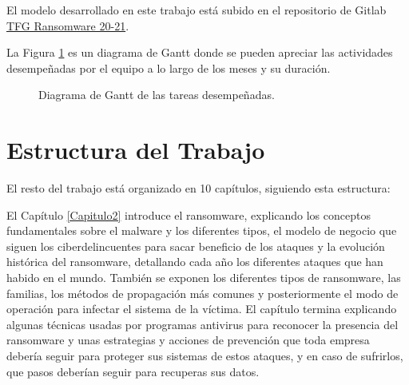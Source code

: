 El modelo desarrollado en este trabajo está subido en el repositorio de Gitlab \href{https://gitlab.fdi.ucm.es/marina.lopez/tfg-ransomware-20-21}{TFG Ransomware 20-21}.


La Figura \ref{fig:gantt} es un diagrama de Gantt donde se pueden apreciar las actividades desempeñadas por el equipo a lo largo de los meses y su duración.

\begin{figure}[htb]
\begin{center}
{}
\end{center}
\caption{Diagrama de Gantt de las tareas desempeñadas.}
\label{fig:gantt}
\end{figure}

\section{Estructura del Trabajo}
\noindent El resto del trabajo está organizado en 10 capítulos, siguiendo esta estructura:

El Capítulo \ref{Capitulo2} introduce el ransomware, explicando los conceptos fundamentales sobre el malware y los diferentes tipos, el modelo de negocio que siguen los ciberdelincuentes para sacar beneficio de los ataques y la evolución histórica del ransomware, detallando cada año los diferentes ataques que han habido en el mundo. También se exponen los diferentes tipos de ransomware, las familias, los métodos de propagación más comunes y posteriormente el modo de operación para infectar el sistema de la víctima. El capítulo termina explicando algunas técnicas usadas por programas antivirus para reconocer la presencia del ransomware y unas estrategias y acciones de prevención que toda empresa debería seguir para proteger sus sistemas de estos ataques, y en caso de sufrirlos, que pasos deberían seguir para recuperas sus datos.


